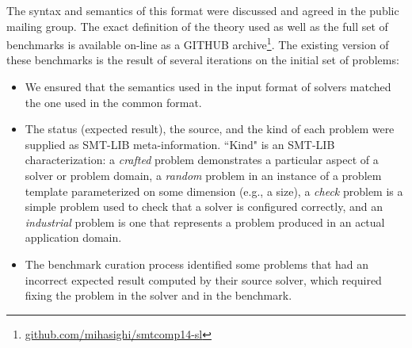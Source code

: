 \documentclass{llncs}
\newcommand{\SLEEK}{\textsc{Sleek}}
\begin{document}
The syntax and semantics of this format were discussed and agreed in the public mailing group. 
The exact definition of the theory used as well as the full set of benchmarks is available on-line as a GITHUB archive\footnote{\url{github.com/mihasighi/smtcomp14-sl}}.
The existing version of these benchmarks is the result of several iterations on the initial set of problems:
\begin{itemize}
\item We ensured that the semantics used in the input format of solvers matched the one used in the common format. 
\item The status (expected result), the source, and the kind of each problem were supplied as SMT-LIB meta-information. ``Kind" is an SMT-LIB characterization: a \textit{crafted} problem demonstrates a particular aspect of a solver or problem domain, a \textit{random} problem in an instance of a problem template parameterized on some dimension (e.g., a size), a \textit{check} problem is a simple problem used to check that a solver is configured correctly, and an \textit{industrial} problem is one that represents a problem produced in an actual application domain.
\item The benchmark curation process identified some problems that had an incorrect expected result computed by their source solver, which required fixing the problem in the solver and in the benchmark.
\end{itemize}
\end{document}
